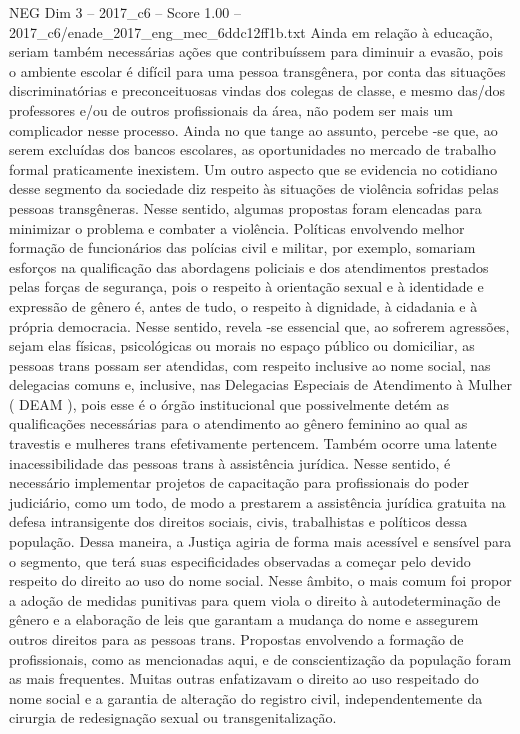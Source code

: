 \begin{textsample}{NEG Dim 3 – 2017\_c6 – Score 1.00 – 2017\_c6/enade\_2017\_eng\_mec\_6ddc12ff1b.txt}
Ainda em relação à educação, seriam também necessárias ações que contribuíssem para diminuir a evasão, pois o ambiente escolar é difícil para uma pessoa transgênera, por conta das situações discriminatórias e preconceituosas vindas dos colegas de classe, e mesmo das/dos professores e/ou de outros profissionais da área, não podem ser mais um complicador nesse processo.
Ainda no que tange ao assunto, percebe -se que, ao serem excluídas dos bancos escolares, as oportunidades no mercado de trabalho formal praticamente inexistem.
Um outro aspecto que se evidencia no cotidiano desse segmento da sociedade diz respeito às situações de violência sofridas pelas pessoas transgêneras.
Nesse sentido, algumas propostas foram elencadas para minimizar o problema e combater a violência.
Políticas envolvendo melhor formação de funcionários das polícias civil e militar, por exemplo, somariam esforços na qualificação das abordagens policiais e dos atendimentos prestados pelas forças de segurança, pois o respeito à orientação sexual e à identidade e expressão de gênero é, antes de tudo, o respeito à dignidade, à cidadania e à própria democracia.
Nesse sentido, revela -se essencial que, ao sofrerem agressões, sejam elas físicas, psicológicas ou morais no espaço público ou domiciliar, as pessoas trans possam ser atendidas, com respeito inclusive ao nome social, nas delegacias comuns e, inclusive, nas Delegacias Especiais de Atendimento à Mulher ( DEAM ), pois esse é o órgão institucional que possivelmente detém as qualificações necessárias para o atendimento ao gênero feminino ao qual as travestis e mulheres trans efetivamente pertencem.
Também ocorre uma latente inacessibilidade das pessoas trans à assistência jurídica.
Nesse sentido, é necessário implementar projetos de capacitação para profissionais do poder judiciário, como um todo, de modo a prestarem a assistência jurídica gratuita na defesa intransigente dos direitos sociais, civis, trabalhistas e políticos dessa população.
Dessa maneira, a Justiça agiria de forma mais acessível e sensível para o segmento, que terá suas especificidades observadas a começar pelo devido respeito do direito ao uso do nome social.
Nesse âmbito, o mais comum foi propor a adoção de medidas punitivas para quem viola o direito à autodeterminação de gênero e a elaboração de leis que garantam a mudança do nome e assegurem outros direitos para as pessoas trans.
Propostas envolvendo a formação de profissionais, como as mencionadas aqui, e de conscientização da população foram as mais frequentes.
Muitas outras enfatizavam o direito ao uso respeitado do nome social e a garantia de alteração do registro civil, independentemente da cirurgia de redesignação sexual ou transgenitalização.

\end{textsample}
